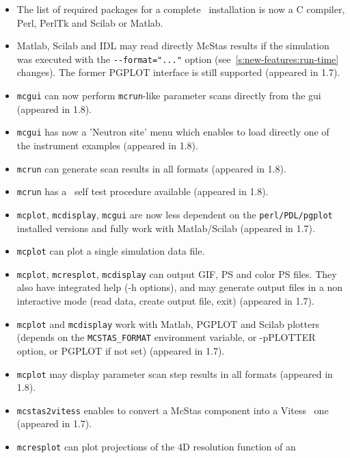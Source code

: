 \begin{itemize}
\item The list of required packages for a complete \MCS\ installation is now a C
    compiler, Perl, PerlTk and Scilab or Matlab.
\item Matlab, Scilab and IDL may read directly McStas results if the simulation
    was executed with the \verb+--format="..."+ option 
    (see~\ref{s:new-features:run-time} changes). The former PGPLOT interface is
    still supported (appeared in 1.7).  
          
\item\verb+mcgui+ can now perform \verb+mcrun+-like parameter scans
    directly from the gui (appeared in 1.8).
\item\verb+mcgui+ has now a 'Neutron site' menu which enables to load directly one of the
    instrument examples (appeared in 1.8).
\item \verb+mcrun+ can generate scan results in all formats (appeared in 1.8). 
\item \verb+mcrun+ has a \MCS\ self test procedure available (appeared in 1.8). 
\item \verb+mcplot+, \verb+mcdisplay+, \verb+mcgui+ are now less dependent on the
    \verb+perl/PDL/pgplot+ installed versions and fully work with Matlab/Scilab (appeared in 1.7). 
\item \verb+mcplot+ can plot a single simulation data file.
\item \verb+mcplot+, \verb+mcresplot+, \verb+mcdisplay+ can output GIF, PS and color
    PS files. They also have integrated help (-h options), and may generate output
    files in a non interactive mode (read data, create output file, exit) (appeared in 1.7).
\item \verb+mcplot+ and \verb+mcdisplay+ work with Matlab, PGPLOT and Scilab plotters
   (depends on the \verb+MCSTAS_FORMAT+ environment variable, or -pPLOTTER option, or
   PGPLOT if not set) (appeared in 1.7).
\item \verb+mcplot+ may display parameter scan step results in all formats
   (appeared in 1.8).  
\item \verb+mcstas2vitess+ enables to convert a McStas component into a
   Vitess~\cite{vitess_webpage} one (appeared in 1.7). 
\item \verb+mcresplot+ can plot projections of the 4D resolution function of an 

\end{itemize}

